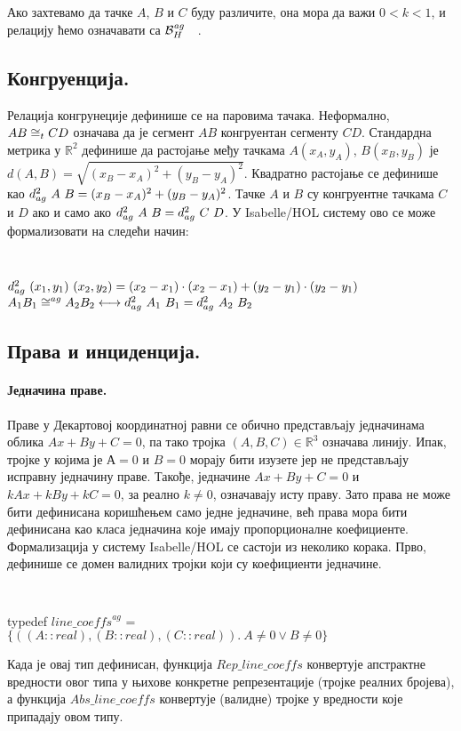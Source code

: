 \noindent Ако захтевамо да тачке $A$, $B$ и $C$ буду различите, она
мора да важи $0 < k < 1$, и релацију ћемо означавати са
$\mathcal{B}_H^{\mathit{ag}}\ \ \ $.

\subsection{Конгруенција.} Релација конгрунеције дефинише се на паровима
тачака. Неформално, $AB \cong_t CD$ означава да је сегмент $AB$
конгруентан сегменту $CD$. Стандардна метрика у $\mathbb{R}^2$
дефинише да растојање међу тачкама $A(x_A, y_A)$, $B(x_B, y_B)$ је
$d(A, B) = \sqrt{(x_B-x_A)^2+(y_B-y_A)^2}$. Квадратно растојање се
дефинише као $d^2_{ag}\ A\ B = (x_B-x_A)^2+(y_B-y_A)^2$. Тачке $A$ и
$B$ су конгруентне тачкама $C$ и $D$ ако и само ако $d^2_{ag}\ A\ B =
d^2_{ag}\ C\ D$. У Isabelle/HOL систему ово се може формализовати на
следећи начин:

{\tt
\begin{tabbing}
$d^2_{ag}\ (x_1, y_1)\ (x_2, y_2) = (x_2-x_1)\cdot (x_2-x_1)+(y_2-y_1)\cdot (y_2-y_1)$\\
$A_1B_1 \cong^{ag} A_2B_2 \longleftrightarrow d^2_{ag}\ A_1\ B_1 = d^2_{ag}\ A_2\ B_2$
\end{tabbing}
}

\subsection{Права и инциденција.}

\paragraph{Једначина праве.}
Праве у Декартовој координатној равни се обично представљају
једначинама облика $Ax + By + C = 0$, па тако тројка $(A, B, C) \in
\mathbb{R}^3$ означава линију. Ипак, тројке у којима је $А = 0$ и $B =
0$ морају бити изузете јер не представљају исправну једначину
праве. Такође, једначине $Ax + By + C = 0$ и $kAx + kBy + kC = 0$, за
реално $k \neq 0$, означавају исту праву. Зато права не може бити
дефинисана коришћењем само једне једначине, већ права мора бити
дефинисана као класа једначина које имају пропорционалне
коефициенте. Формализација у систему Isabelle/HOL се састоји из
неколико корака. Прво, дефинише се домен валидних тројки који су
коефициенти једначине.
{\tt
\begin{tabbing}
typedef $\mathit{line\_coeffs}^{ag}$ = \\
\hspace{5mm}$\{((A::real), (B::real), (C::real)).\ A \neq 0 \vee B \neq 0\}$
\end{tabbing}
}
\noindent Када је овај тип дефинисан, функција
$\mathit{Rep\_line\_coeffs}$ конвертује апстрактне вредности овог типа
у њихове конкретне репрезентације (тројке реалних бројева), а функција
$\mathit{Abs\_line\_coeffs}$ конвертује (валидне) тројке у вредности
које припадају овом типу.

